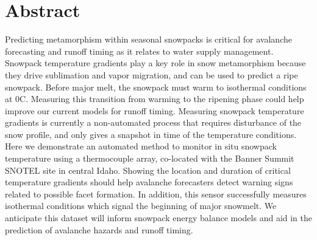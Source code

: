 \chapter*{Abstract}

Predicting metamorphism within seasonal snowpacks is critical for avalanche forecasting and runoff timing as it relates to water supply management. Snowpack temperature gradients play a key role in snow metamorphism because they drive sublimation and vapor migration, and can be used to predict a ripe snowpack. Before major melt, the snowpack must warm to isothermal conditions at 0\textdegree C. Measuring this transition from warming to the ripening phase could help improve our current models for runoff timing. Measuring snowpack temperature gradients is currently a non-automated process that requires disturbance of the snow profile, and only gives a snapshot in time of the temperature conditions. Here we demonstrate an automated method to monitor in situ snowpack temperature using a thermocouple array, co-located with the Banner Summit SNOTEL site in central Idaho. Showing the location and duration of critical temperature gradients should help avalanche forecasters detect warning signs related to possible facet formation. In addition, this sensor successfully measures isothermal conditions which signal the beginning of major snowmelt. We anticipate this dataset will inform snowpack energy balance models and aid in the prediction of avalanche hazards and runoff timing.
